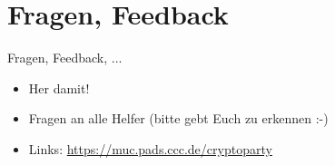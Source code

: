 \section{Fragen, Feedback}
\begin{frame}{Fragen, Feedback, ...}
  \begin{itemize}
    \item{Her damit!}
    \item{Fragen an alle Helfer (bitte gebt Euch zu erkennen :-)}
    \item{Links: \url{https://muc.pads.ccc.de/cryptoparty}}
  \end{itemize}
\end{frame}

\endinput
